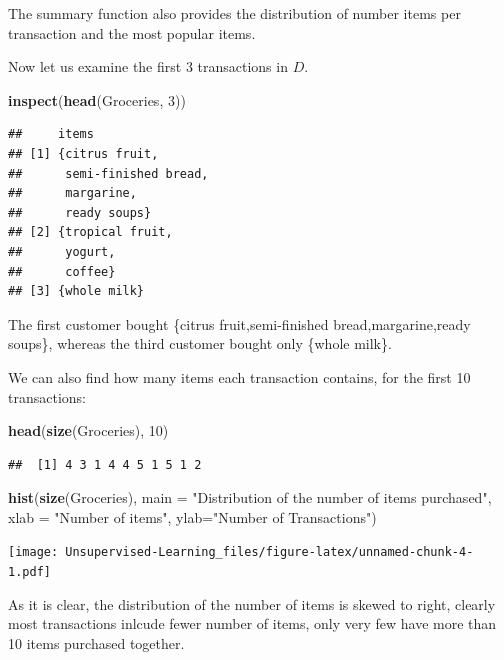 \documentclass[
]{book}
\newenvironment{Shaded}{\begin{snugshade}}{\end{snugshade}}
\newcommand{\DataTypeTok}[1]{\textcolor[rgb]{0.13,0.29,0.53}{#1}}
\newcommand{\DecValTok}[1]{\textcolor[rgb]{0.00,0.00,0.81}{#1}}
\newcommand{\KeywordTok}[1]{\textcolor[rgb]{0.13,0.29,0.53}{\textbf{#1}}}
\newcommand{\NormalTok}[1]{#1}
\newcommand{\StringTok}[1]{\textcolor[rgb]{0.31,0.60,0.02}{#1}}
\begin{document}
The summary function also provides the distribution of number items per transaction and the most popular items.

Now let us examine the first 3 transactions in \(D\).

\begin{Shaded}
\begin{Highlighting}[]
\KeywordTok{inspect}\NormalTok{(}\KeywordTok{head}\NormalTok{(Groceries, }\DecValTok{3}\NormalTok{))}
\end{Highlighting}
\end{Shaded}

\begin{verbatim}
##     items                
## [1] {citrus fruit,       
##      semi-finished bread,
##      margarine,          
##      ready soups}        
## [2] {tropical fruit,     
##      yogurt,             
##      coffee}             
## [3] {whole milk}
\end{verbatim}

The first customer bought {\{citrus fruit,semi-finished bread,margarine,ready soups\}}, whereas the third customer bought only {\{whole milk\}}.

We can also find how many items each transaction contains, for the first 10 transactions:

\begin{Shaded}
\begin{Highlighting}[]
\KeywordTok{head}\NormalTok{(}\KeywordTok{size}\NormalTok{(Groceries), }\DecValTok{10}\NormalTok{)}
\end{Highlighting}
\end{Shaded}

\begin{verbatim}
##  [1] 4 3 1 4 4 5 1 5 1 2
\end{verbatim}

\begin{Shaded}
\begin{Highlighting}[]
\KeywordTok{hist}\NormalTok{(}\KeywordTok{size}\NormalTok{(Groceries), }\DataTypeTok{main =} \StringTok{"Distribution of the number of items purchased"}\NormalTok{, }\DataTypeTok{xlab =} \StringTok{"Number of items"}\NormalTok{, }\DataTypeTok{ylab=}\StringTok{"Number of Transactions"}\NormalTok{)}
\end{Highlighting}
\end{Shaded}

\texttt{[image: Unsupervised-Learning\_files/figure-latex/unnamed-chunk-4-1.pdf]}

As it is clear, the distribution of the number of items is skewed to right, clearly most transactions inlcude fewer number of items, only very few have more than 10 items purchased together.
\end{document}
